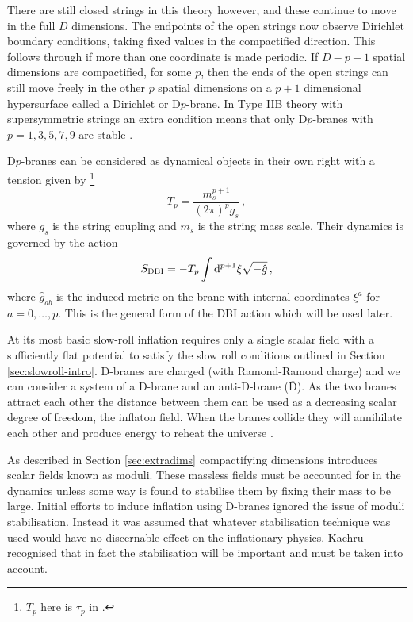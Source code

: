 There are still closed strings in this theory however, and these continue to
move in the full $D$ dimensions. The endpoints of the open strings now observe
Dirichlet boundary conditions, taking fixed values in the compactified
direction. This follows through if more than one coordinate is made periodic.
If $D-p-1$ spatial dimensions are compactified, for some $p$, then the ends of
the open
strings can still move freely in the other $p$ spatial dimensions on a $p+1$
dimensional hypersurface called a Dirichlet or D$p$-brane. 
% 
In Type IIB theory with supersymmetric strings an extra condition means that
only D$p$-branes with $p=1,3,5,7,9$ are stable \footnotemark.
% 

D$p$-branes can be considered as dynamical objects in their own right with a
tension given by \cite{Johnson2000}\footnote{$T_p$ here is $\tau_p$ in
\cite{Johnson2000}.}
% 
\begin{equation}
\label{eq:branetensiondefn-dbiintro}
 T_p = \frac{m_s^{p+1}}{(2\pi)^p g_s}\,,
\end{equation}
% 
where $g_s$ is the string coupling and $m_s$ is the string mass scale.
Their dynamics is governed by the action 
% 
\begin{equation}
\label{eq:gendbiaction-dbiintro}
 S_\mathrm{DBI} = -T_p \int \mathrm{d}^{p+1}\xi \sqrt{-\hat{g}}\,,
\end{equation}
where $\hat{g}_{ab}$ is the induced metric on the brane with internal
coordinates $\xi^a$ for $a=0,\ldots,p$. This is the general form of the DBI
action which will be used later.


At its most basic slow-roll inflation requires only a single scalar field with a
sufficiently flat potential to satisfy the slow roll conditions outlined in
Section \ref{sec:slowroll-intro}. D-branes are charged (with Ramond-Ramond
charge) and we can consider a system of a D-brane and an anti-D-brane
($\overline{\mathrm{D}}$). As the two branes attract each other the distance
between them can be used as a decreasing scalar degree of freedom, the
inflaton field. 
When the branes collide they will annihilate each other and produce energy to
reheat the universe \cite{brane1,brane2,brane3,brane7,Brodie:2003qv,brane9}. 

As described in Section \ref{sec:extradims} compactifying dimensions
introduces scalar fields known as moduli. These massless fields must be
accounted for in the dynamics unless some way is found to stabilise them by
fixing their mass to be large.
Initial efforts to induce inflation using D-branes ignored the issue of moduli
stabilisation. Instead it was
assumed that whatever stabilisation technique was used would have no discernable
effect on the inflationary physics. Kachru \etal \cite{brane4} recognised that
in fact the stabilisation will be important and must be taken into account.

